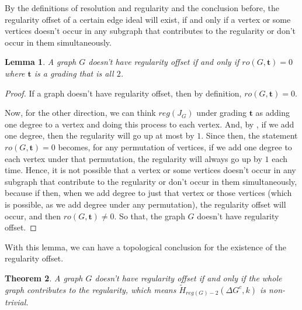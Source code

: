 \documentclass[dvipsnames,10pt]{article}
\newtheorem{theorem}{Theorem}[section]
\newtheorem{lemma}[theorem]{Lemma}
\begin{document}
By the definitions of resolution and regularity and the conclusion before, the regularity offset of a certain edge ideal will exist, if and only if a vertex or some vertices doesn't occur in any subgraph that contributes to the regularity or don't occur in them simultaneously. 

\begin{lemma}
    A graph $G$ doesn't have regularity offset if and only if $ro(G,\mathbf{t})=0$ where $\mathbf{t}$ is a grading that is all $2$.
\end{lemma}

\begin{proof}
    If a graph doesn't have regularity offset, then by definition, $ro(G,\mathbf{t})=0$.

    Now, for the other direction, we can think $reg(J_G)$ under grading $\mathbf{t}$ as adding one degree to a vertex and doing this process to each vertex. And, by , if we add one degree, then the regularity will go up at most by $1$. Since then, the statement $ro(G,\mathbf{t})=0$ becomes, for any permutation of vertices, if we add one degree to each vertex under that permutation, the regularity will always go up by $1$ each time. Hence, it is not possible that a vertex or some vertices doesn't occur in any subgraph that contribute to the regularity or don't occur in them simultaneously, because if then, when we add degree to just that vertex or those vertices (which is possible, as we add degree under any permutation), the regularity offset will occur, and then $ro(G,\mathbf{t})\neq0$. So that, the graph $G$ doesn't have regularity offset. 
\end{proof}

With this lemma, we can have a topological conclusion for the existence of the regularity offset.

\begin{theorem}
    A graph $G$ doesn't have regularity offset if and only if the whole graph contributes to the regularity, which means $\widetilde{H}_{reg(G)-2}\left(\Delta G^c, k\right)$ is non-trivial.
\end{theorem}
\end{document}
